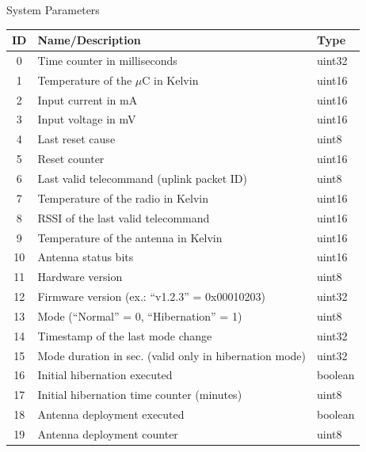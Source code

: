 \begin{frame}{System Parameters}

\begin{table}[!htb]\tiny
    \centering
    \label{tab:vars-and-pars}
    \begin{tabular}{cll}
        \toprule[1.5pt]
        \textbf{ID} & \textbf{Name/Description} & \textbf{Type}\\
        \midrule
        0   & Time counter in milliseconds                            & uint32 \\
        1   & Temperature of the $\mu$C in Kelvin                     & uint16 \\
        2   & Input current in mA                                     & uint16 \\
        3   & Input voltage in mV                                     & uint16 \\
        4   & Last reset cause                                        & uint8 \\
        5   & Reset counter                                           & uint16 \\
        6   & Last valid telecommand (uplink packet ID)               & uint8  \\
        7   & Temperature of the radio in Kelvin                      & uint16 \\
        8   & RSSI of the last valid telecommand                      & uint16 \\
        9   & Temperature of the antenna in Kelvin                    & uint16 \\
        10  & Antenna status bits                                     & uint16 \\
        11  & Hardware version                                        & uint8 \\
        12  & Firmware version (ex.: ``v1.2.3'' = 0x00010203)         & uint32 \\
        13  & Mode (``Normal'' = 0, ``Hibernation'' = 1)              & uint8 \\
        14  & Timestamp of the last mode change                       & uint32 \\
        15  & Mode duration in sec. (valid only in hibernation mode)  & uint32 \\
        16  & Initial hibernation executed                            & boolean \\
        17  & Initial hibernation time counter (minutes)              & uint8 \\
        18  & Antenna deployment executed                             & boolean \\
        19  & Antenna deployment counter                              & uint8 \\
        \bottomrule[1.5pt]
    \end{tabular}
\end{table}

\end{frame}

